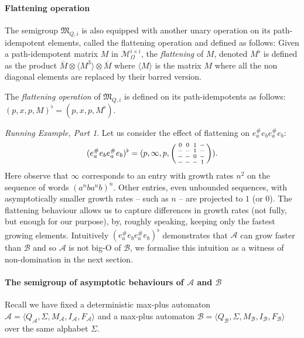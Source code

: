 \documentclass{lmcs}
\theoremstyle{remark}
\newcommand{\matricesOm}[2]{\mathcal{M}^{#1 \times #2}_\Omega}
\newcommand{\ideal}{\mathfrak{M}}
\newcommand{\autA}{\mathcal{A}}
\newcommand{\autB}{\mathcal{B}}
\newcommand{\nopath}{-}
\newenvironment{smallpmatrix}
  {\left(\begin{smallmatrix}}
  {\end{smallmatrix}\right)}
\theoremstyle{remark}
\newtheorem{runningexample/}{Running Example, Part}
\newenvironment{runningexample}
  {\renewcommand{\qedsymbol}{\color{darkgray}\ensuremath{\lrcorner}}%
   \pushQED{\qed}\begin{runningexample/}}
  {\popQED\end{runningexample/}}
\begin{document}
\paragraph*{Flattening operation}
The semigroup $\ideal_{Q,i}$ is also equipped with another unary operation on its path-idempotent elements, called the flattening operation and defined as follows: Given a path-idempotent matrix $M$ in $\matricesOm{i}{i}$, the \emph{flattening} of $M$, denoted $M^\flat$ is defined as the product $\overline{M}\otimes \langle M^3 \rangle \otimes \overline{M}$ where $\langle M \rangle$ is the matrix $M$ where all the non diagonal elements are replaced by their barred version.

\begin{defi}\label{def:op:flat}
The \emph{flattening operation} of $\ideal_{Q,i}$ is defined on its path-idempotents as follows: $(p,x,p,M)^\flat = (p,x,p,M^\flat)$.
\end{defi}

\begin{runningexample}
Let us consider the effect of flattening on $e_a^\#e_be_a^\#e_b$:
 \[
(e_a^\#e_be_a^\#e_b)^\flat= (p,\infty,p,
\begin{smallpmatrix}
0 & 0 & 1 & \nopath\\
\nopath & \nopath & 1 & \nopath\\
\nopath & \nopath & 0 & \nopath\\
\nopath & \nopath & \nopath & 1
\end{smallpmatrix}).
\]
Here observe that $\infty$ corresponds to an entry with growth rates $n^2$ on the sequence of words $(a^nba^nb)^n$. Other entries, even unbounded sequences, with asymptotically smaller growth rates -- such as $n$ -- are projected to $1$ (or $0$). The flattening behaviour allows us to capture differences in growth rates (not fully, but enough for our purpose), by, roughly speaking, keeping only the fastest growing elements. Intuitively $(e_a^\#e_be_a^\#e_b)^\flat$ demonstrates that $\autA$ can grow faster than $\autB$ and so $\autA$ is not big-O of $\autB$, we formalise this intuition as a witness of non-domination in the next section.
\end{runningexample}

\paragraph*{The semigroup of asymptotic behaviours of $\autA$ and $\autB$}

Recall we have fixed a deterministic max-plus automaton $\autA = \langle Q_\autA, \Sigma, M_\autA, I_\autA, F_\autA\rangle$ and a max-plus automaton $\autB = \langle Q_\autB, \Sigma, M_\autB, I_\autB, F_\autB\rangle$ over the same alphabet $\Sigma$.
\end{document}
